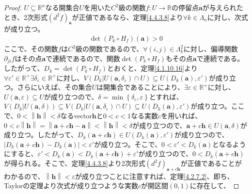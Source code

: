 \documentclass[dvipdfmx]{jsarticle}
\begin{document}
\begin{proof}
$U \subseteq \mathbb{R}^{n}$なる開集合$U$を用いた$C^{2}$級の関数$f:U \rightarrow \mathbb{R}$の停留点$\mathbf{a}$が与えられたとき、2次形式$\left( d^{2}f \right)_{\mathbf{a}}$が正値であるなら、定理\ref{4.4.3.8}より$\forall k \in \varLambda_{n}$に対し、次式が成り立つ。
\begin{align*}
\det{\left( P_{k} \circ H_{f} \right)\left( \mathbf{a} \right)} > 0
\end{align*}
ここで、その関数$f$は$C^{2}$級の関数であるので、$\forall(i,j) \in \varLambda_{k}^{2}$に対し、偏導関数$\partial_{ji}f$はその点$\mathbf{a}$で連続であるので、関数$\det\left( P_{k} \circ H_{f} \right)$もその点$\mathbf{a}$で連続である。したがって、$D_{k} = \det\left( P_{k} \circ H_{f} \right)$とおくと、定理\ref{4.1.10.16}より$\forall\varepsilon' \in \mathbb{R}^{+}\exists\delta_{\varepsilon} \in \mathbb{R}^{+}$に対し、$V\left( D_{k}|U\left( \mathbf{a},\delta_{\varepsilon} \right) \cap U \right) \subseteq U\left( D_{k}\left( \mathbf{a} \right),\varepsilon' \right)$が成り立つ。さらにいえば、その集合$U$は開集合であることにより、$\exists\varepsilon \in \mathbb{R}^{+}$に対し、$U\left( \mathbf{a},\varepsilon \right) \subseteq U$が成り立つので、$\delta = \min\left\{ \delta_{\varepsilon},\varepsilon \right\}$とすれば、$V\left( D_{k}|U\left( \mathbf{a},\delta \right) \right) \subseteq V\left( D_{k}|U\left( \mathbf{a},\delta_{\varepsilon} \right) \cap U \right) \subseteq U\left( D_{k}\left( \mathbf{a} \right),\varepsilon' \right)$が成り立つ。ここで、$0 < \left\| \mathbf{h} \right\| < \delta$なるvector$\mathbf{h}$と$0 < c < 1$なる実数$c$を用いれば、$0 < c\left\| \mathbf{h} \right\| = \left\| \mathbf{a} + c\mathbf{h} - \mathbf{a} \right\| < \left\| \mathbf{h} \right\| < \delta$が成り立つので、$\mathbf{a} + c\mathbf{h} \in U\left( \mathbf{a},\delta \right)$が成り立つ。したがって、$D_{k}\left( \mathbf{a} + c\mathbf{h} \right) \in U\left( D_{k}\left( \mathbf{a} \right),\varepsilon' \right)$が成り立つので、$\left| D_{k}\left( \mathbf{a} + c\mathbf{h} \right) - D_{k}\left( \mathbf{a} \right) \right| < \varepsilon'$が成り立つ。そこで、$0 < \varepsilon' < D_{k}\left( \mathbf{a} \right)$となるようにすると、$\varepsilon' < D_{k}\left( \mathbf{a} \right) < D_{k}\left( \mathbf{a} + c\mathbf{h} \right) + \varepsilon'$が成り立つので、$0 < D_{k}\left( \mathbf{a} + c\mathbf{h} \right)$が得られる。そこで、定理\ref{4.4.3.8}より2次形式$\left( d^{2}f \right)_{\mathbf{a} + c\mathbf{h}}$が正値であることがわかるので、$\left\| \mathbf{h} \right\| < \varepsilon$が成り立つことに注意すれば、定理\ref{4.2.7.2}、即ち、Taylorの定理より次式が成り立つような実数$c$が開区間$(0,1)$に存在して、

\end{proof}
\end{document}
